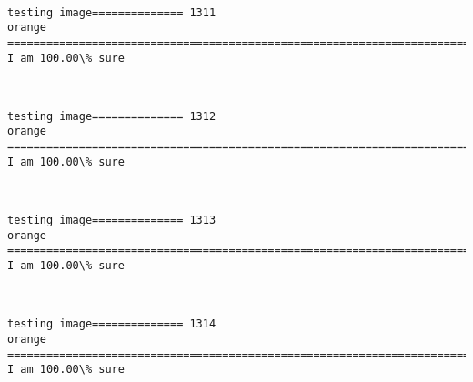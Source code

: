 \documentclass[11pt]{article}
\begin{document}
    \begin{center}
    \end{center}
    { \hspace*{\fill} \\}
    
    \begin{Verbatim}[commandchars=\\\{\}]
testing image============== 1311
orange
============================================================================
I am 100.00\% sure

    \end{Verbatim}

    \begin{center}
    \end{center}
    { \hspace*{\fill} \\}
    
    \begin{Verbatim}[commandchars=\\\{\}]
testing image============== 1312
orange
============================================================================
I am 100.00\% sure

    \end{Verbatim}

    \begin{center}
    \end{center}
    { \hspace*{\fill} \\}
    
    \begin{Verbatim}[commandchars=\\\{\}]
testing image============== 1313
orange
============================================================================
I am 100.00\% sure

    \end{Verbatim}

    \begin{center}
    \end{center}
    { \hspace*{\fill} \\}
    
    \begin{Verbatim}[commandchars=\\\{\}]
testing image============== 1314
orange
============================================================================
I am 100.00\% sure

    \end{Verbatim}
\end{document}

